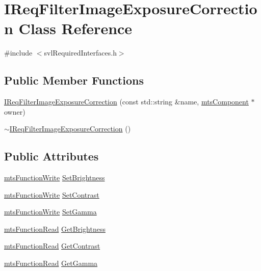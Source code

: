 \hypertarget{class_i_req_filter_image_exposure_correction}{\section{I\-Req\-Filter\-Image\-Exposure\-Correction Class Reference}
\label{class_i_req_filter_image_exposure_correction}
}


{\ttfamily \#include $<$svl\-Required\-Interfaces.\-h$>$}

\subsection*{Public Member Functions}
\begin{DoxyCompactItemize}
\item 
\hyperlink{class_i_req_filter_image_exposure_correction_a7216e4ce4ce08e6b617407f69a6bf13c}{I\-Req\-Filter\-Image\-Exposure\-Correction} (const std\-::string \&name, \hyperlink{classmts_component}{mts\-Component} $\ast$owner)
\item 
\hyperlink{class_i_req_filter_image_exposure_correction_a7a63553621a2b3f7958b296b40e91b10}{$\sim$\-I\-Req\-Filter\-Image\-Exposure\-Correction} ()
\end{DoxyCompactItemize}
\subsection*{Public Attributes}
\begin{DoxyCompactItemize}
\item 
\hyperlink{classmts_function_write}{mts\-Function\-Write} \hyperlink{class_i_req_filter_image_exposure_correction_aab5dc4a1893b746eeb20af029f7a0511}{Set\-Brightness}
\item 
\hyperlink{classmts_function_write}{mts\-Function\-Write} \hyperlink{class_i_req_filter_image_exposure_correction_a72a66c9ea243b3702d5f9bd6127a44f8}{Set\-Contrast}
\item 
\hyperlink{classmts_function_write}{mts\-Function\-Write} \hyperlink{class_i_req_filter_image_exposure_correction_aa7eef8c01d176c56c5b2ed5aab3f903e}{Set\-Gamma}
\item 
\hyperlink{classmts_function_read}{mts\-Function\-Read} \hyperlink{class_i_req_filter_image_exposure_correction_a7ea608f2b4bd3510224d43ebc508345b}{Get\-Brightness}
\item 
\hyperlink{classmts_function_read}{mts\-Function\-Read} \hyperlink{class_i_req_filter_image_exposure_correction_a2b4f60e404340b9ce84f32bd560cdcf1}{Get\-Contrast}
\item 
\hyperlink{classmts_function_read}{mts\-Function\-Read} \hyperlink{class_i_req_filter_image_exposure_correction_a2d7fcf152f3396e83b7a828f09c172f4}{Get\-Gamma}
\end{DoxyCompactItemize}


